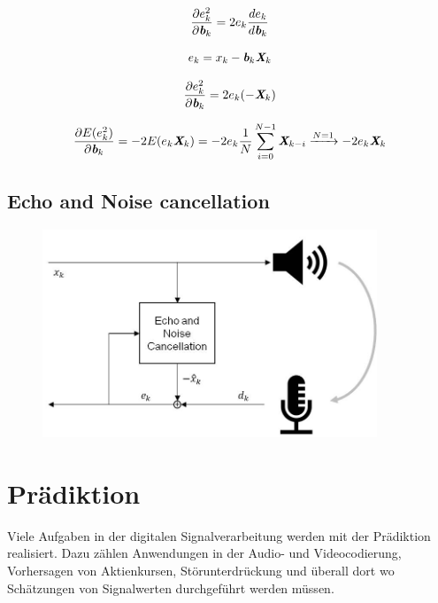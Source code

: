\documentclass[
    10pt, %
    DIV12,
    english, %
    a5paper, %
    twoside, %
    titlepage, %
    parskip=half, %
    headings=small, %
    listof=totoc, %
    bibliography=totoc, %
    index=totoc, %
    captions=tableheading, %
    final %
]{scrbook}
\begin{document}
\begin{equation}
\frac{\partial e_k^2}{\partial \textit{\textbf{b}}_k}=2e_k\frac{de_k}{d \textit{\textbf{b}}_k} \nonumber
\end{equation}

\begin{equation}
e_k=x_k-\textit{\textbf{b}}_k \textit{\textbf{X}}_k \nonumber
\end{equation}

\begin{equation}
\frac{\partial e_k^2}{\partial \textit{\textbf{b}}_k}=2e_k(-\textit{\textbf{X}}_k)\nonumber
\end{equation}

\begin{equation}
\frac{\partial E(e_k^2)}{\partial \textit{\textbf{b}}_k}=-2E(e_k\textit{\textbf{X}}_k)=-2e_k \frac{1}{N}\sum_{i=0}^{N-1}\textit{\textbf{X}}_{k-i}\xrightarrow{N=1}-2e_k\textit{\textbf{X}}_k\nonumber
\end{equation}

\section{Echo and Noise cancellation}

\begin{figure}[H]
\centering
\includegraphics[width=10cm]{../Images/EchoNoiseCancellation.jpg}
\end{figure}

\chapter{Prädiktion}
Viele Aufgaben in der digitalen Signalverarbeitung werden mit der Prädiktion realisiert. Dazu zählen Anwendungen in der Audio- und Videocodierung, Vorhersagen von Aktienkursen, 
Störunterdrückung und überall dort wo Schätzungen von Signalwerten durchgeführt werden müssen.
\end{document}
